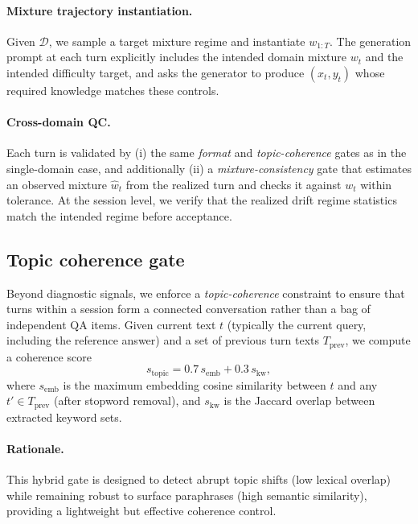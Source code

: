 \paragraph{Mixture trajectory instantiation.}
Given $\mathcal{D}$, we sample a target mixture regime and instantiate $w_{1:T}$. The generation prompt at each turn explicitly includes the intended domain mixture $w_t$ and the intended difficulty target, and asks the generator to produce $(x_t,y_t)$ whose required knowledge matches these controls.

\paragraph{Cross-domain QC.}
Each turn is validated by (i) the same \emph{format} and \emph{topic-coherence} gates as in the single-domain case, and additionally (ii) a \emph{mixture-consistency} gate that estimates an observed mixture $\hat{w}_t$ from the realized turn and checks it against $w_t$ within tolerance.
At the session level, we verify that the realized drift regime statistics match the intended regime before acceptance.

\subsection{Topic coherence gate}
\label{app:topic_coherence_gate}

Beyond diagnostic signals, we enforce a \emph{topic-coherence} constraint to ensure that turns within a session form a connected conversation rather than a bag of independent QA items. Given current text $t$ (typically the current query, including the reference answer) and a set of previous turn texts $T_{\mathrm{prev}}$, we compute a coherence score
\begin{equation}
\label{eq:topic coherence}
s_{\mathrm{topic}} = 0.7\,s_{\mathrm{emb}} + 0.3\,s_{\mathrm{kw}},
\end{equation}
where $s_{\mathrm{emb}}$ is the maximum embedding cosine similarity between $t$ and any $t'\in T_{\mathrm{prev}}$ (after stopword removal), and $s_{\mathrm{kw}}$ is the Jaccard overlap between extracted keyword sets.

\paragraph{Rationale.}
This hybrid gate is designed to detect abrupt topic shifts (low lexical overlap) while remaining robust to surface paraphrases (high semantic similarity), providing a lightweight but effective coherence control.

